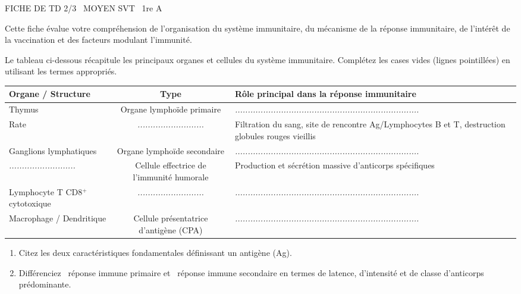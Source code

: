 \documentclass[11pt]{article}
\begin{document}
\begin{tcolorbox}[enhanced,colback=popink,colframe=popink,arc=10pt,boxrule=0pt,left=12pt,right=12pt,top=9pt,bottom=9pt]
{\color{white}\popxbold\small FICHE DE TD 2/3 \textbullet\ MOYEN \hfill SVT \textbullet\ 1re A\par}
\end{tcolorbox}
\vspace{4pt}
Cette fiche évalue votre compréhension de l'organisation du système immunitaire, du mécanisme de la réponse immunitaire, de l'intérêt de la vaccination et des facteurs modulant l'immunité.

\begin{exercice}
Le tableau ci-dessous récapitule les principaux organes et cellules du système immunitaire. Complétez les cases vides (lignes pointillées) en utilisant les termes appropriés.

\begin{tabularx}{\linewidth}{|X|c|X|}
\hline
\textbf{Organe / Structure} & \textbf{Type} & \textbf{Rôle principal dans la réponse immunitaire} \\
\hline
Thymus & Organe lymphoïde primaire & \textit{........................................................................} \\
\hline
Rate & \textit{..........................} & Filtration du sang, site de rencontre Ag/Lymphocytes B et T, destruction globules rouges vieillis \\
\hline
Ganglions lymphatiques & Organe lymphoïde secondaire & \textit{........................................................................} \\
\hline
\textit{..........................} & Cellule effectrice de l'immunité humorale & Production et sécrétion massive d'anticorps spécifiques \\
\hline
Lymphocyte T CD8$^+$ cytotoxique & \textit{..........................} & \textit{........................................................................} \\
\hline
Macrophage / Dendritique & Cellule présentatrice d'antigène (CPA) & \textit{........................................................................} \\
\hline
\end{tabularx}

\begin{enumerate}
    \item Citez les deux caractéristiques fondamentales définissant un antigène (Ag).
    \item Différenciez \og\ réponse immune primaire\fg{} et \og\ réponse immune secondaire\fg{} en termes de latence, d'intensité et de classe d'anticorps prédominante.
\end{enumerate}
\end{exercice}
\end{document}
